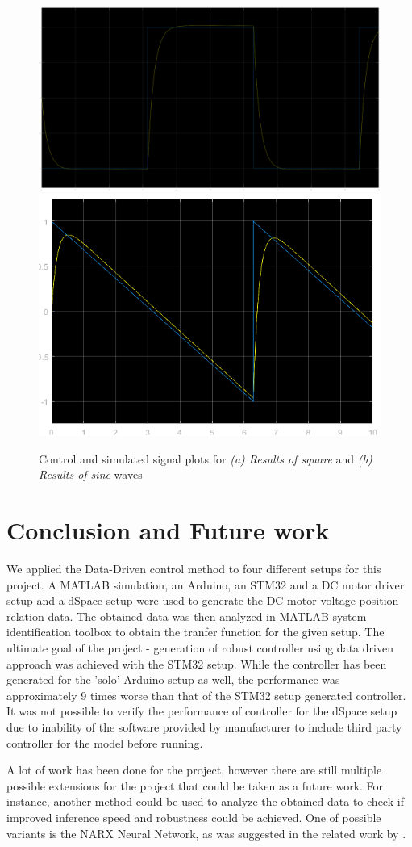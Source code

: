 \documentclass[]{final_report}
\begin{document}
\begin{figure} [h!]
\centerline{\includegraphics[width=.45\textwidth]{Screenshots for paper/arduino/Final_hardware_testing/square_response.png}
{\includegraphics[width=.35\textwidth]{Screenshots for paper/arduino/Final_hardware_testing/untitled.png}}
}
\caption{Control and simulated signal plots for \emph{(a) Results of square} and \textit{(b) Results of sine} waves }
\label{fig:tfresultsim2}
\end{figure}

\chapter{Conclusion and Future work}
We applied the Data-Driven control method to four different setups for this project. A MATLAB simulation, an Arduino, an STM32 and a DC motor driver setup and a dSpace setup were used to generate the DC motor voltage-position relation data. The obtained data was then analyzed in MATLAB system identification toolbox to obtain the tranfer function for the given setup. The ultimate goal of the project - generation of robust controller using data driven approach was achieved with the STM32 setup. While the controller has been generated for the 'solo' Arduino setup as well, the performance was approximately 9 times worse than that of the STM32 setup generated controller. It was not possible to verify the performance of controller for the dSpace setup due to inability of the software provided by manufacturer to include third party controller for the model before running.

A lot of work has been done for the project, however there are still multiple possible extensions for the project that could be taken as a future work. For instance, another method could be used to analyze the obtained data to check if improved inference speed and robustness could be achieved. One of possible variants is the NARX Neural Network, as was suggested in the related work by \cite{naung2018a}.


\newpage

 

\label{endpage}
\end{document}
